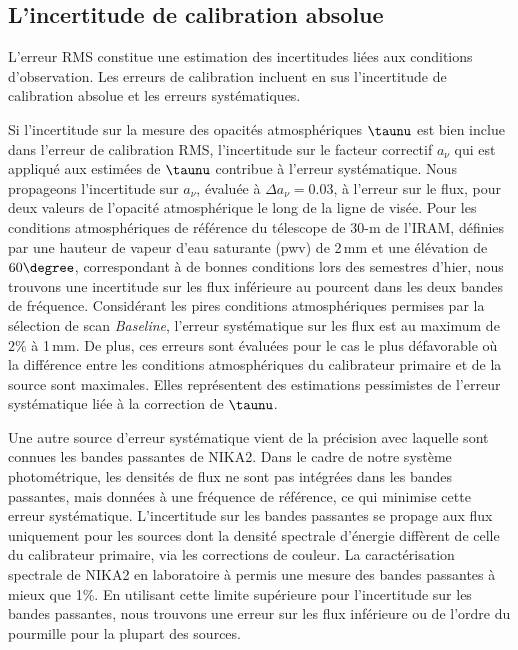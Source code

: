 \subsection{L'incertitude de calibration absolue}
\label{se:syste}

L'erreur RMS constitue une estimation des incertitudes liées
aux conditions d'observation. Les erreurs de calibration incluent en
sus l'incertitude de calibration absolue et les erreurs
systématiques.  

Si l'incertitude sur la mesure des opacités
atmosphériques $\taunu$ est bien inclue dans l'erreur de calibration
RMS, l'incertitude sur le facteur correctif $a_\nu$ qui est appliqué
aux estimées de $\taunu$ contribue à l'erreur systématique. Nous
propageons l'incertitude sur $a_\nu$, évaluée à $\Delta a_\nu = 0.03$,
à l'erreur sur le flux, pour deux valeurs de l'opacité atmosphérique
le long de la ligne de visée. Pour les conditions atmosphériques de
référence du télescope de 30-m de l'IRAM, définies par une hauteur
de vapeur d'eau saturante (pwv) de 2\,mm et une élévation de
$60\degree$, correspondant à de bonnes conditions lors des semestres
d'hier, nous trouvons une incertitude sur les flux inférieure au
pourcent dans les deux bandes de fréquence. Considérant les pires
conditions atmosphériques permises par la sélection de scan
\emph{Baseline}, l'erreur systématique sur les flux est au maximum de
$2\%$ à 1\,mm. De plus, ces erreurs sont évaluées pour le cas le plus
défavorable où la différence entre les conditions atmosphériques du
calibrateur primaire et de la source sont maximales. Elles représentent
des estimations pessimistes de l'erreur systématique liée à la
correction de $\taunu$.

Une autre source d'erreur systématique vient de la précision avec
laquelle sont connues les bandes passantes de NIKA2. Dans le cadre de
notre système photométrique, les densités de flux ne sont pas
intégrées dans les bandes passantes, mais données à une
fréquence de référence, ce qui minimise cette erreur
systématique. L'incertitude sur les bandes passantes se propage aux
flux uniquement pour les sources dont la densité spectrale d'énergie
diffèrent de celle du calibrateur primaire, via les corrections de
couleur. La caractérisation spectrale de NIKA2 en laboratoire à permis
une mesure des bandes passantes à mieux que 1\%. En utilisant cette
limite supérieure pour l'incertitude sur les bandes passantes, nous
trouvons une erreur sur les flux inférieure ou de l'ordre du pourmille
pour la plupart des sources. 

